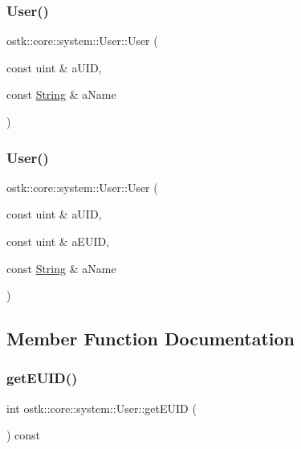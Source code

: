 \subsubsection{\texorpdfstring{User()}{User()}\hspace{0.1cm}{\footnotesize\ttfamily [1/2]}}
{\footnotesize\ttfamily ostk\+::core\+::system\+::\+User\+::\+User (\begin{DoxyParamCaption}\item[{const uint \&}]{a\+U\+ID,  }\item[{const \hyperlink{classostk_1_1core_1_1types_1_1_string}{String} \&}]{a\+Name }\end{DoxyParamCaption})}

\mbox{\label{classostk_1_1core_1_1system_1_1_user_a136687a5b8b44617158bb3d14d4697c8}} 
\subsubsection{\texorpdfstring{User()}{User()}\hspace{0.1cm}{\footnotesize\ttfamily [2/2]}}
{\footnotesize\ttfamily ostk\+::core\+::system\+::\+User\+::\+User (\begin{DoxyParamCaption}\item[{const uint \&}]{a\+U\+ID,  }\item[{const uint \&}]{a\+E\+U\+ID,  }\item[{const \hyperlink{classostk_1_1core_1_1types_1_1_string}{String} \&}]{a\+Name }\end{DoxyParamCaption})}



\subsection{Member Function Documentation}
\mbox{\label{classostk_1_1core_1_1system_1_1_user_ac4c9c03e93d714ccf43b6160c73e9604}} 
\subsubsection{\texorpdfstring{get\+E\+U\+I\+D()}{getEUID()}}
{\footnotesize\ttfamily int ostk\+::core\+::system\+::\+User\+::get\+E\+U\+ID (\begin{DoxyParamCaption}{ }\end{DoxyParamCaption}) const}

